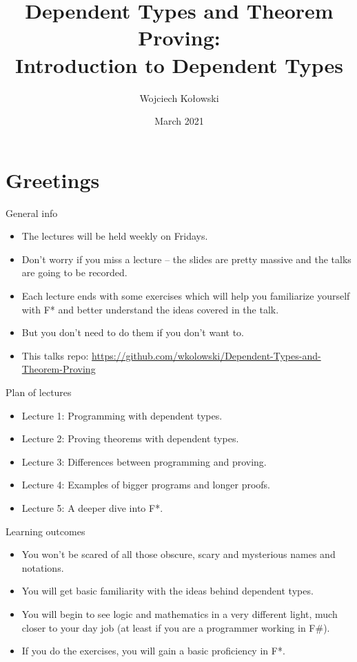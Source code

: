 \documentclass{beamer}
\title{Dependent Types and Theorem Proving: \\Introduction to Dependent Types}
\author{Wojciech Kołowski}
\date{March 2021}
\begin{document}
\frame{\titlepage}
\frame{\tableofcontents}

\section{Greetings}

\begin{frame}{General info}
\begin{itemize}
	\item The lectures will be held weekly on Fridays.
	\item Don't worry if you miss a lecture -- the slides are pretty massive and the talks are going to be recorded.
	\item Each lecture ends with some exercises which will help you familiarize yourself with F* and better understand the ideas covered in the talk.
	\item But you don't need to do them if you don't want to.
	\item This talks repo: \url{https://github.com/wkolowski/Dependent-Types-and-Theorem-Proving}
\end{itemize}
\end{frame}

\begin{frame}{Plan of lectures}
\begin{itemize}
	\item Lecture 1: Programming with dependent types.
	\item Lecture 2: Proving theorems with dependent types.
	\item Lecture 3: Differences between programming and proving.
	\item Lecture 4: Examples of bigger programs and longer proofs.
	\item Lecture 5: A deeper dive into F*.
\end{itemize}
\end{frame}

\begin{frame}{Learning outcomes}
\begin{itemize}
	\item You won't be scared of all those obscure, scary and mysterious names and notations.
	\item You will get basic familiarity with the ideas behind dependent types.
	\item You will begin to see logic and mathematics in a very different light, much closer to your day job (at least if you are a programmer working in F\#).
	\item If you do the exercises, you will gain a basic proficiency in F*.
\end{itemize}
\end{frame}
\end{document}
